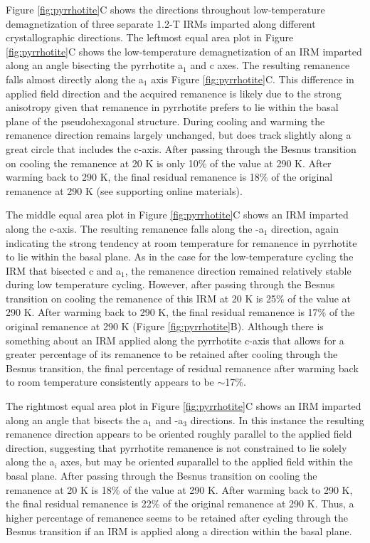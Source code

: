 \documentclass[draft,gc]{AGUTeX}
\begin{document}
\begin{article}
Figure \ref{fig:pyrrhotite}C shows the directions throughout low-temperature demagnetization of three separate 1.2-T IRMs imparted along different crystallographic directions. The leftmost equal area plot in Figure \ref{fig:pyrrhotite}C shows the low-temperature demagnetization of an IRM imparted along an angle bisecting the pyrrhotite a$_{1}$ and c axes. The resulting remanence falls almost directly along the a$_{1}$ axis Figure \ref{fig:pyrrhotite}C. This difference in applied field direction and the acquired remanence is likely due to the strong anisotropy given that remanence in pyrrhotite prefers to lie within the basal plane of the pseudohexagonal structure. During cooling and warming the remanence direction remains largely unchanged, but does track slightly along a great circle that includes the c-axis. After passing through the Besnus transition on cooling the remanence at 20 K is only 10\% of the value at 290 K. After warming back to 290 K, the final residual remanence is 18\% of the original remanence at 290 K (see supporting online materials).

The middle equal area plot in Figure \ref{fig:pyrrhotite}C shows an IRM imparted along the c-axis. The resulting remanence falls along the -a$_{1}$ direction, again indicating the strong tendency at room temperature for remanence in pyrrhotite to lie within the basal plane. As in the case for the low-temperature cycling the IRM that bisected c and a$_{1}$, the remanence direction remained relatively stable during low temperature cycling. However, after passing through the Besnus transition on cooling the remanence of this IRM at 20 K is 25\% of the value at 290 K. After warming back to 290 K, the final residual remanence is 17\% of the original remanence at 290 K (Figure \ref{fig:pyrrhotite}B). Although there is something about an IRM applied along the pyrrhotite c-axis that allows for a greater percentage of its remanence to be retained after cooling through the Besnus transition, the final percentage of residual remanence after warming back to room temperature consistently appears to be $\sim$17\%.    

The rightmost equal area plot in Figure \ref{fig:pyrrhotite}C shows an IRM imparted along an angle that bisects the a$_{1}$ and -a$_{3}$ directions. In this instance the resulting remanence direction appears to be oriented roughly parallel to the applied field direction, suggesting that pyrrhotite remanence is not constrained to lie solely along the a$_{i}$ axes, but may be oriented suparallel to the applied field within the basal plane. After passing through the Besnus transition on cooling the remanence at 20 K is 18\% of the value at 290 K. After warming back to 290 K, the final residual remanence is 22\% of the original remanence at 290 K. Thus, a higher percentage of remanence seems to be retained after cycling through the Besnus transition if an IRM is applied along a direction within the basal plane. 


\end{article}
\end{document}
